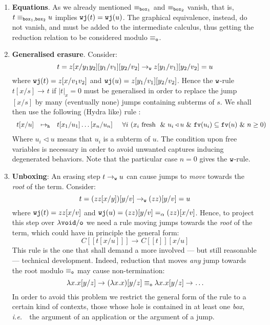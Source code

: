 \documentclass{LMCS}
\newcommand{\ie}{{\it  i.e.}~}
\renewcommand{\>}{\rightarrow}
\def\lam{\lambda}
\newcommand{\Rew}[1]{\rightarrow_{#1}}
\newcommand{\dis}{{\tt j}}
\newcommand{\fv}[1]{{\tt fv}(#1)}
\newcommand{\Gc}{{\tt w}}
\newcommand{\deft}[1]{{\bf #1}}
\newcommand{\wfc}{\Gc\dis}
\newcommand{\modulo}[2]{#1/#2}
\newcommand{\eqw}[1]{\equiv_{#1}}
\newcommand{\eqo}{\equiv_\osym}
\newcommand{\osym}{{\tt o}}
\newcommand{\osymb}{{\tt o}}
\newcommand{\aux}{{\tt void}}
\newcommand{\lauxm}{\lam\modulo{ \aux }{ \osymb }}
\newcommand{\New}{{\tt h}}
\newcommand{\ctx}[2]{#1 [ \! [#2] \! ]}
\newcommand{\boite}{{\tt box}}
\newcommand{\sigt}{\boite_1}
\newcommand{\sigq}{\boite_2}
\newcommand{\subt}{\triangleleft}
\begin{document}
\begin{enumerate}[(1)]
\item 
\deft{Equations}. 
As we already mentioned $\eqw{\sigt}$ and $\eqw{\sigq}$
vanish, that is, 
$t\eqw{\sigt,  \sigq} u$ implies
$\wfc(t)=\wfc(u)$. The graphical equivalence, instead,
do not vanish, and must be added to the intermediate calculus, thus 
getting  the reduction  relation to be considered modulo $\eqo$.


  \item \deft{Generalised erasure}. Consider:
$$t=z[x/y_1 y_2][y_1/v_1] [y_2/v_2]\Rew{\Gc} z[y_1/v_1] [y_2/v_2]=u$$
where $\wfc(t)=z[x/v_1 v_2]$ and $\wfc(u)=z[y_1/v_1] [y_2/v_2]$. 
Hence the $\Gc$-rule $t[x/s]\Rew{} t$ if $|t|_x=0$
must be generalised in order to replace
the jump $[x/s]$ by many (eventually none) jumps containing subterms of $s$.  We shall
then use the following (Hydra like) rule :
\[ \begin{array}{lll@{\hspace{.5cm}}lll}
t[x/u] & \mapsto_{\New} & t[x_{1}/u_{1}]\ldots [x_n/u_n] & \forall i\
            (x_i \mbox{ fresh }\ \&\ u_i \subt
            u\ \&\ \fv{u_i} \subseteq \fv{u}\ \&\ n \geq 0)\\
\end{array}\] 
Where $u_i\subt u$ means that $u_i$ is a subterm of $u$. The condition upon
free variables is necessary in order to avoid unwanted captures
inducing degenerated behaviors. Note that the particular case $n=0$ gives
the $\Gc$-rule.
\item \deft{Unboxing}: An erasing step
$t\Rew{\Gc} u$ can cause jumps
to \textit{move} towards the \textit{root} of the term. Consider:
$$t=(z z[x/y])[y/v]\Rew{\Gc} (z z)[y/v]=u$$
where $\wfc(t)=z z[x/v]$ and $\wfc(u)=(z z)[y/v]=_\alpha (z z)[x/v]$.  
Hence, to project this step over $\lauxm$ we need a rule moving
jumps towards the \textit{root} of the term, which could have in
principle the general form:
$$\ctx{C}{t[x/u]}\Rew{} \ctx{C}{t}[x/u]$$ 
This rule is the one that shall demand a more involved --- but
still reasonable --- technical development. Indeed, 
reduction that moves  \textit{any} jump towards the root  modulo $\eqo$  may cause non-termination:
$$\lam x. x[y/z]\Rew{}(\lam x. x)[y/z]\eqo\lam x. x[y/z]\Rew{}\ldots$$ 
In order to avoid this problem we
restrict the general form of the rule to a certain kind of contexts, those
whose hole is contained in at least one \textit{box}, \ie\  
the argument of an application or the argument of a
jump. \medskip
\end{enumerate}
\end{document}
